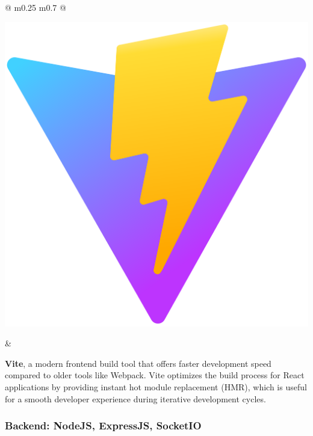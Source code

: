 	\begin{tabular}{ @{} m{0.25\textwidth} m{0.7\textwidth} @{} }
		\begin{minipage}{\linewidth}
			\centering
			\includegraphics[width=0.45\linewidth]{graphics/vite.png}
			\label{fig:vite}
		\end{minipage}
		&
		\begin{minipage}{\linewidth}
			\textbf{Vite}, a modern frontend build tool that offers faster development speed compared to older tools like Webpack. Vite optimizes the build process for React applications by providing instant hot module replacement (HMR), which is useful for a smooth developer experience during iterative development cycles. \cite{vite}
		\end{minipage}
	\end{tabular}
	\vspace*{0.5 cm}
	
	
	\subsubsection{Backend: NodeJS, ExpressJS, SocketIO}
	
